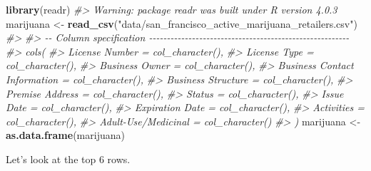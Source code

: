 \documentclass[
  12pt,
]{book}
\newenvironment{Shaded}{\begin{snugshade}}{\end{snugshade}}
\newcommand{\CommentTok}[1]{\textcolor[rgb]{0.37,0.37,0.37}{\textit{#1}}}
\newcommand{\KeywordTok}[1]{\textcolor[rgb]{0.27,0.27,0.27}{\textbf{#1}}}
\newcommand{\NormalTok}[1]{#1}
\newcommand{\StringTok}[1]{\textcolor[rgb]{0.5,0.5,0.5}{#1}}
\begin{document}
\begin{Shaded}
\begin{Highlighting}[]
\KeywordTok{library}\NormalTok{(readr)}
\CommentTok{\#\textgreater{} Warning: package \textquotesingle{}readr\textquotesingle{} was built under R version 4.0.3}
\NormalTok{marijuana \textless{}{-}}\StringTok{ }\KeywordTok{read\_csv}\NormalTok{(}\StringTok{"data/san\_francisco\_active\_marijuana\_retailers.csv"}\NormalTok{)}
\CommentTok{\#\textgreater{} }
\CommentTok{\#\textgreater{} {-}{-} Column specification {-}{-}{-}{-}{-}{-}{-}{-}{-}{-}{-}{-}{-}{-}{-}{-}{-}{-}{-}{-}{-}{-}{-}{-}{-}{-}{-}{-}{-}{-}{-}{-}{-}{-}{-}{-}{-}{-}{-}{-}{-}{-}{-}{-}{-}{-}{-}{-}{-}{-}{-}{-}{-}{-}{-}{-}}
\CommentTok{\#\textgreater{} cols(}
\CommentTok{\#\textgreater{}   \textasciigrave{}License Number\textasciigrave{} = col\_character(),}
\CommentTok{\#\textgreater{}   \textasciigrave{}License Type\textasciigrave{} = col\_character(),}
\CommentTok{\#\textgreater{}   \textasciigrave{}Business Owner\textasciigrave{} = col\_character(),}
\CommentTok{\#\textgreater{}   \textasciigrave{}Business Contact Information\textasciigrave{} = col\_character(),}
\CommentTok{\#\textgreater{}   \textasciigrave{}Business Structure\textasciigrave{} = col\_character(),}
\CommentTok{\#\textgreater{}   \textasciigrave{}Premise Address\textasciigrave{} = col\_character(),}
\CommentTok{\#\textgreater{}   Status = col\_character(),}
\CommentTok{\#\textgreater{}   \textasciigrave{}Issue Date\textasciigrave{} = col\_character(),}
\CommentTok{\#\textgreater{}   \textasciigrave{}Expiration Date\textasciigrave{} = col\_character(),}
\CommentTok{\#\textgreater{}   Activities = col\_character(),}
\CommentTok{\#\textgreater{}   \textasciigrave{}Adult{-}Use/Medicinal\textasciigrave{} = col\_character()}
\CommentTok{\#\textgreater{} )}
\NormalTok{marijuana \textless{}{-}}\StringTok{ }\KeywordTok{as.data.frame}\NormalTok{(marijuana)}
\end{Highlighting}
\end{Shaded}

Let's look at the top 6 rows.
\end{document}
